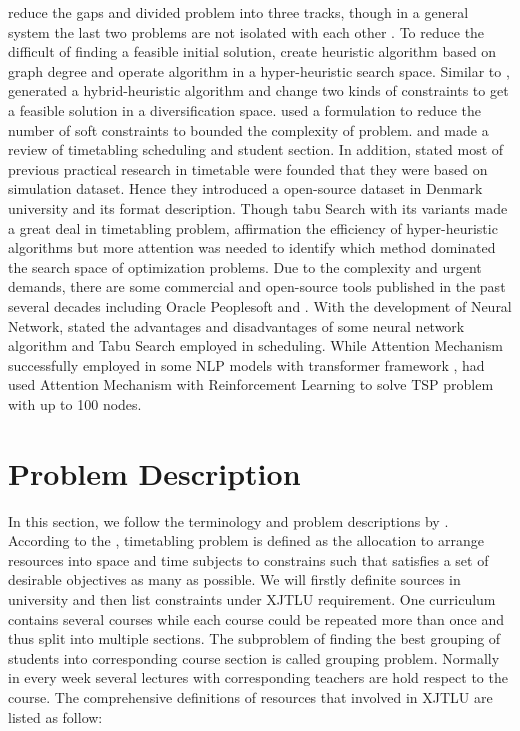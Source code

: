 \documentclass{article}
\begin{document}
reduce the gaps and divided problem into three tracks, though in a general system the last two problems are not isolated with each other \citep{()unitime}. To reduce the difficult of finding a feasible initial solution, \cite{(burke2007)graphbased} create heuristic algorithm based on graph degree and operate algorithm in a hyper-heuristic search space. Similar to \cite{(hertz1987)using}, \cite{(tuga2007)hybrid} generated a hybrid-heuristic algorithm and change two kinds of constraints to get a feasible solution in a diversification space. \cite{(burke2012)branchandcut} used a formulation to reduce the number of soft constraints to bounded the complexity of problem. \cite{(kristiansen2013)comprehensive} and \cite{(johnes2015)operational} made a review of timetabling scheduling and student section. In addition, \cite{(kristiansen2013)comprehensive} stated most of previous practical research in timetable were founded that they were based on simulation dataset. Hence they introduced a open-source dataset in Denmark university and its format description. Though tabu Search with its variants made a great deal in timetabling problem, \cite{(fazelzarandi2020)state} affirmation the efficiency of hyper-heuristic algorithms but more attention was needed to identify which method dominated the search space of optimization problems. Due to the complexity and urgent demands, there are some commercial and open-source tools published in the past several decades including Oracle Peoplesoft and \cite{()unitime}. With the development of Neural Network, \cite{(fazelzarandi2020)state} stated the advantages and disadvantages of some neural network algorithm and Tabu Search employed in scheduling. While Attention Mechanism successfully employed in some NLP models with transformer framework \citep{(ashishvaswani2017)attention,(devlin2019)bert}, \cite{(kool2019)attention} had used Attention Mechanism with Reinforcement Learning to solve TSP problem with up to 100 nodes.

\newpage

\section{Problem Description}
\label{sec: Problem Description}

In this section, we follow the terminology and problem descriptions by \cite{(werra1985)introduction}. According to the \cite{(wren1996)scheduling}, timetabling problem is defined as the allocation to arrange resources into space and time subjects to constrains such that satisfies a set of desirable objectives as many as possible. We will firstly definite sources in university and then list constraints under XJTLU requirement. One curriculum contains several courses while each course could be repeated more than once and thus split into multiple sections. The subproblem of finding the best grouping of students into corresponding course section is called grouping problem. Normally in every week several lectures with corresponding teachers are hold respect to the course. The comprehensive definitions of resources that involved in XJTLU are listed as follow:
\end{document}
